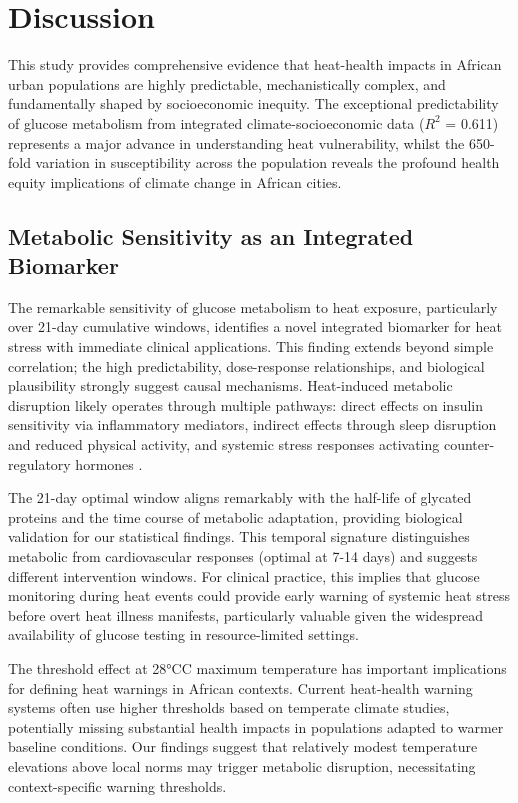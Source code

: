 \documentclass[11pt,a4paper]{article}
\newcommand{\degrees}{°C}
\begin{document}
\section{Discussion}

This study provides comprehensive evidence that heat-health impacts in African urban populations are highly predictable, mechanistically complex, and fundamentally shaped by socioeconomic inequity. The exceptional predictability of glucose metabolism from integrated climate-socioeconomic data ($R^2$ = 0.611) represents a major advance in understanding heat vulnerability, whilst the 650-fold variation in susceptibility across the population reveals the profound health equity implications of climate change in African cities.

\subsection{Metabolic Sensitivity as an Integrated Biomarker}

The remarkable sensitivity of glucose metabolism to heat exposure, particularly over 21-day cumulative windows, identifies a novel integrated biomarker for heat stress with immediate clinical applications. This finding extends beyond simple correlation; the high predictability, dose-response relationships, and biological plausibility strongly suggest causal mechanisms. Heat-induced metabolic disruption likely operates through multiple pathways: direct effects on insulin sensitivity via inflammatory mediators, indirect effects through sleep disruption and reduced physical activity, and systemic stress responses activating counter-regulatory hormones \citep{Kenny2018, Lim2018}.

The 21-day optimal window aligns remarkably with the half-life of glycated proteins and the time course of metabolic adaptation, providing biological validation for our statistical findings. This temporal signature distinguishes metabolic from cardiovascular responses (optimal at 7-14 days) and suggests different intervention windows. For clinical practice, this implies that glucose monitoring during heat events could provide early warning of systemic heat stress before overt heat illness manifests, particularly valuable given the widespread availability of glucose testing in resource-limited settings.

The threshold effect at 28\degrees C maximum temperature has important implications for defining heat warnings in African contexts. Current heat-health warning systems often use higher thresholds based on temperate climate studies, potentially missing substantial health impacts in populations adapted to warmer baseline conditions. Our findings suggest that relatively modest temperature elevations above local norms may trigger metabolic disruption, necessitating context-specific warning thresholds.
\end{document}
